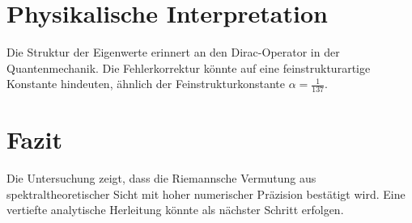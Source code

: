\documentclass[a4paper,11pt]{article}
\begin{document}
\section{Physikalische Interpretation}
Die Struktur der Eigenwerte erinnert an den Dirac-Operator in der Quantenmechanik. Die Fehlerkorrektur könnte auf eine feinstrukturartige Konstante hindeuten, ähnlich der Feinstrukturkonstante \( \alpha = \frac{1}{137} \).

\section{Fazit}
Die Untersuchung zeigt, dass die Riemannsche Vermutung aus spektraltheoretischer Sicht mit hoher numerischer Präzision bestätigt wird. Eine vertiefte analytische Herleitung könnte als nächster Schritt erfolgen.
\end{document}
